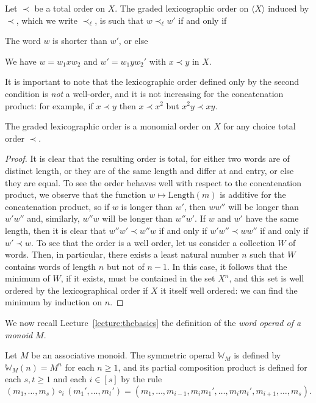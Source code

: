 \begin{definition}
Let $\prec$ be a total order on $X$. 
The graded lexicographic order on $\langle X\rangle$
induced by $\prec$, which we write $\prec_\ell$,
is such that $w\prec_\ell w'$ if and only if
\begin{tenumerate}
\item The word $w$ is shorter than $w'$, or else
\item We have
$w = w_1 xw_2$ and $w' = w_1 y w_2'$ with
$x\prec y$ in $X$.
\end{tenumerate}
\end{definition}

It is important to note that the lexicographic order defined only
by the second condition is \emph{not} a well-order, and it is 
not increasing for the concatenation product: for example,
if $x\prec y$ then $x \prec x^2$ but $x^2y \prec xy$. 

\begin{lemma}
The graded lexicographic order is a monomial order on $X$
for any choice total order $\prec$.
\end{lemma}

\begin{proof}
It is clear that the resulting order is total, for either
two words are of distinct length, or they are of the same length
and differ at and entry, or else they are equal. To see the
order behaves well with respect to the concatenation product,
we observe that the function $w\longmapsto \mathrm{Length}(m)$
is additive for the concatenation product, so if $w$ is longer
than $w'$, then $ww''$ will be longer than $w'w''$ and,
similarly, $w''w$ will be longer than $w''w'$. If $w$ and 
$w'$ have the same length, then it is clear that
$w''w'\prec w''w$ if and only if $w'w''\prec ww''$ if
and only if $w' \prec w$. To see that the order is a well
order, let us consider a collection $W$ of words. Then,
in particular, there exists a least natural number $n$
such that $W$ contains words of length $n$ but not of $n-1$. 
In this case, it follows that the minimum of $W$, if it
exists, must be contained in the set $X^n$, and this
set is well ordered by the lexicographical order if
$X$ it itself well ordered: we can find the minimum 
by induction on $n$.
\end{proof}

We now recall Lecture~\ref{lecture:thebasics} the definition
of the \emph{word operad of a monoid $M$}.

\begin{definition}
Let $M$ be an associative monoid. The symmetric
operad $\mathbb W_M$ is defined by $\mathbb{W}_M(n) =
M^n$ for each $n\geqslant 1$, and its partial composition
product is defined for each $s,t\geqslant 1$ and each
$i\in [s]$ by the rule
\[(m_1,\ldots,m_s) \circ_i (m_1',\ldots,m_t') = 
 	(m_1,\ldots,m_{i-1}, m_im_1',\ldots,m_im_t',m_{i+1},\ldots, m_s).\] 
\end{definition}

